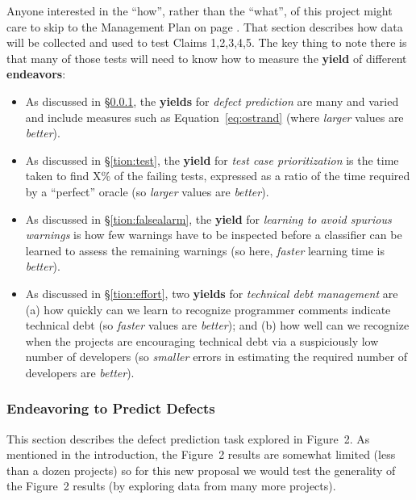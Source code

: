 \documentclass{NSF}
\newenvironment{myitemize}
{ \begin{itemize}
    \setlength{\itemsep}{0pt}
    \setlength{\parskip}{0pt}
    \setlength{\parsep}{0pt}     }
{ \end{itemize}                  }
\newcommand{\bi}{\begin{myitemize}}
\newcommand{\ei}{\end{myitemize}}
\newcommand{\tion}[1]{\S\ref{tion:#1}}
\newcommand{\eq}[1]{Equation~\ref{eq:#1}}
\begin{document}
\begin{nsfdescription}
Anyone  interested in the ``how'', rather than the ``what'', of this project
might care to skip to the Management Plan on page \pageref{tion:plan}. That section 
 describes how  data
will be collected  and used
to test Claims 1,2,3,4,5.  The key thing to note
there is that many of those
tests will need to know how to measure
the {\bf yield} of different {\bf endeavors}:
\bi
\item As discussed in \tion{dp}, the {\bf yields} for {\em defect prediction} are many and varied and include measures such as \eq{ostrand} (where  {\em larger} values are {\em better}).
\item 
As discussed in \tion{test},
the {\bf yield} for
{\em test case prioritization}
is the  time taken to find X\% of the failing tests, expressed as a ratio of the time required by a ``perfect'' oracle (so {\em larger} values are {\em better}).
\item 
As discussed in \tion{falsealarm},
the {\bf yield} for {\em learning to avoid
spurious warnings} is how few warnings have to be inspected before a classifier can be learned to 
assess the remaining warnings (so here, {\em faster} learning time is {\em better}).
\item As discussed in \tion{effort},  two {\bf yields} for
{\em technical debt 
management} are (a) how quickly
can we learn to recognize programmer comments
indicate technical debt (so {\em faster} values are {\em better}); and (b)
 how well can we recognize when the
projects are encouraging technical debt
via  a suspiciously low number of developers
(so {\em smaller} errors in estimating the required number of developers  are {\em better}).
\ei







\subsubsection{Endeavoring to   Predict Defects}\label{tion:dp}

This section describes the defect prediction task explored in Figure~2.
As mentioned in the introduction, the Figure~2 results are somewhat limited (less than a dozen projects) so for this new proposal we would test the generality
of the Figure~2 results (by exploring data from many more projects).
 

\end{nsfdescription}
\end{document}
